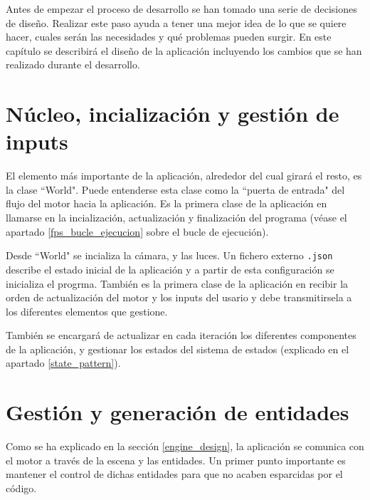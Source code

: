 \label{app_design}
Antes de empezar el proceso de desarrollo se han tomado una serie de decisiones de diseño. Realizar este paso ayuda a tener una mejor idea de lo que se quiere hacer, cuales serán las necesidades y qué problemas pueden surgir. En este capítulo se describirá el diseño de la aplicación incluyendo los cambios que se han realizado durante el desarrollo.

\section{Núcleo, incialización y gestión de inputs}
\label{world}
El elemento más importante de la aplicación, alrededor del cual girará el resto, es la clase ``World". Puede entenderse esta clase como la ``puerta de entrada" del flujo del motor hacia la aplicación. Es la primera clase de la aplicación en llamarse en la incialización, actualización y finalización del programa (véase el apartado \ref{fps_bucle_ejecucion} sobre el bucle de ejecución).

Desde ``World" se incializa la cámara, y las luces. Un fichero externo \texttt{.json} describe el estado inicial de la aplicación y a partir de esta configuración se inicializa el progrma. También es la primera clase de la aplicación en recibir la orden de actualización del motor y los inputs del usario y debe transmitirsela a los diferentes elementos que gestione.

También se encargará de actualizar en cada iteración los diferentes componentes de la aplicación, y gestionar los estados del sistema de estados (explicado en el apartado \ref{state_pattern}).


\section{Gestión y generación de entidades}
\label{managers}

Como se ha explicado en la sección \ref{engine_design}, la aplicación se comunica con el motor a través de la escena y las entidades. Un primer punto importante es mantener el control de dichas entidades para que no acaben esparcidas por el código.

